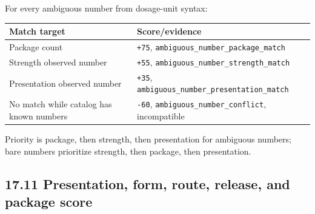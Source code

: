 For every ambiguous number from dosage-unit syntax:

{\def\LTcaptype{none} %
\begin{longtable}[]{@{}>{\RaggedRight\arraybackslash}p{.27\linewidth}>{\RaggedRight\arraybackslash}p{.66\linewidth}@{}}
\toprule\noalign{}
Match target & Score/evidence \\
\midrule\noalign{}
\endhead
\bottomrule\noalign{}
\endlastfoot
Package count & \texttt{+75}, \texttt{ambiguous\_\allowbreak{}number\_\allowbreak{}package\_\allowbreak{}match} \\
Strength observed number & \texttt{+55}, \texttt{ambiguous\_\allowbreak{}number\_\allowbreak{}strength\_\allowbreak{}match} \\
Presentation observed number & \texttt{+35}, \texttt{ambiguous\_\allowbreak{}number\_\allowbreak{}presentation\_\allowbreak{}match} \\
No match while catalog has known numbers & \texttt{-60}, \texttt{ambiguous\_\allowbreak{}number\_\allowbreak{}conflict}, incompatible \\
\end{longtable}
}

Priority is package, then strength, then presentation for ambiguous numbers; bare numbers prioritize strength, then package, then presentation.

\subsection{17.11 Presentation, form, route, release, and package score}\label{1711-presentation-form-route-release-and-package-score}


